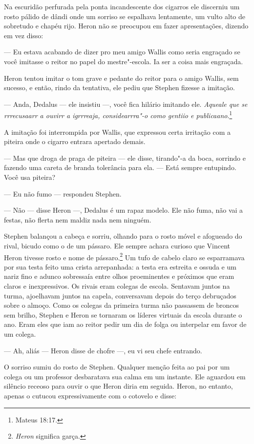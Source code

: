 Na escuridão perfurada pela ponta incandescente dos cigarros ele
discerniu um rosto pálido de dândi onde um sorriso se espalhava
lentamente, um vulto alto de sobretudo e chapéu rijo. Heron não se
preocupou em fazer apresentações, dizendo em vez disso:

 --- Eu estava acabando de dizer pro meu amigo Wallis como seria engraçado
se você imitasse o reitor no papel do mestre"-escola. Ia ser a coisa mais engraçada.

Heron tentou imitar o tom grave e pedante do reitor para o amigo
Wallis, sem sucesso, e então, rindo da tentativa, ele pediu que Stephen
fizesse a imitação.

 --- Anda, Dedalus --- ele insistiu ---, você fica hilário imitando ele.
\textit{Aqueale que se rrrecusaarr a ouvirr a igrrreaja, considearrra"-o
como gentiio e publicaano}.\footnote{ Mateus 18:17.}

A imitação foi interrompida por Wallis, que expressou certa irritação com a piteira 
onde o cigarro entrara apertado demais.

 --- Mas que droga de praga de piteira --- ele disse, tirando"-a da boca,
sorrindo e fazendo uma careta de branda tolerância para ela. --- Está
sempre entupindo. Você usa piteira?

 --- Eu não fumo --- respondeu Stephen.

 --- Não --- disse Heron ---, Dedalus é um rapaz modelo. Ele não fuma, não vai
a festas, não flerta nem maldiz nada nem ninguém.

Stephen balançou a cabeça e sorriu, olhando para o rosto móvel e
afogueado do rival, bicudo como o de um pássaro. Ele sempre achara
curioso que Vincent Heron tivesse rosto e nome de pássaro.\footnote{
\textit{Heron} significa garça.} Um tufo de cabelo claro se esparramava por
sua testa feito uma crista arrepanhada: a testa era estreita e ossuda e
um nariz fino e adunco sobressaía entre olhos proeminentes e
próximos que eram claros e inexpressivos. Os rivais eram colegas de
escola. Sentavam juntos na turma, ajoelhavam juntos na capela,
conversavam depois do terço debruçados sobre o almoço. Como os colegas
da primeira turma não passassem de broncos sem brilho,
Stephen e Heron se tornaram os líderes virtuais da escola 
durante o ano. Eram eles que iam ao reitor pedir um dia de folga ou
interpelar em favor de um colega.

 --- Ah, aliás --- Heron disse de chofre ---, eu vi seu chefe entrando. 

O sorriso sumiu do rosto de Stephen. Qualquer menção feita ao pai por um
colega ou um professor desbaratava sua calma em um instante. Ele
aguardou em silêncio receoso para ouvir o que Heron diria em seguida.
Heron, no entanto, apenas o cutucou expressivamente com o cotovelo e
disse:

